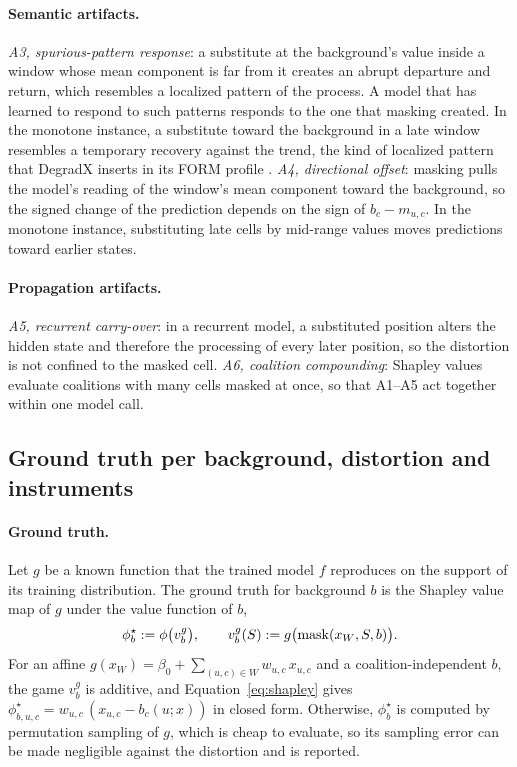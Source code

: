 \documentclass{article}
\begin{document}
\paragraph{Semantic artifacts.} \emph{A3, spurious-pattern response}: a substitute at the background's value inside a window whose mean component is far from it creates an abrupt departure and return, which resembles a localized pattern of the process. A model that has learned to respond to such patterns responds to the one that masking created. In the monotone instance, a substitute toward the background in a late window resembles a temporary recovery against the trend, the kind of localized pattern that DegradX inserts in its FORM profile \citep{degradx2026}. \emph{A4, directional offset}: masking pulls the model's reading of the window's mean component toward the background, so the signed change of the prediction depends on the sign of $b_c-m_{u,c}$. In the monotone instance, substituting late cells by mid-range values moves predictions toward earlier states.

\paragraph{Propagation artifacts.} \emph{A5, recurrent carry-over}: in a recurrent model, a substituted position alters the hidden state and therefore the processing of every later position, so the distortion is not confined to the masked cell. \emph{A6, coalition compounding}: Shapley values evaluate coalitions with many cells masked at once, so that A1--A5 act together within one model call.

\subsection{Ground truth per background, distortion and instruments}\label{sec:method:gt}

\paragraph{Ground truth.} Let $g$ be a known function that the trained model $f$ reproduces on the support of its training distribution. The ground truth for background $b$ is the Shapley value map of $g$ under the value function of $b$,
\begin{equation}\label{eq:gt}
\phi^\star_b := \phi\bigl(v^g_b\bigr), \qquad v^g_b(S) := g\bigl(\operatorname{mask}(x_W,S,b)\bigr).
\end{equation}
For an affine $g(x_W) = \beta_0 + \sum_{(u,c)\in W} w_{u,c}\,x_{u,c}$ and a coalition-independent $b$, the game $v^g_b$ is additive, and Equation~\eqref{eq:shapley} gives $\phi^\star_{b,u,c} = w_{u,c}\,(x_{u,c}-b_c(u;x))$ in closed form. Otherwise, $\phi^\star_b$ is computed by permutation sampling of $g$, which is cheap to evaluate, so its sampling error can be made negligible against the distortion and is reported.
\end{document}
